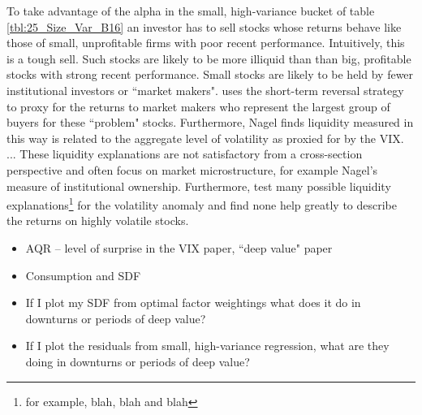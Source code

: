 To take advantage of the alpha in the small, high-variance bucket of table
\ref{tbl:25_Size_Var_B16} an investor has to sell stocks whose returns behave
like those of small, unprofitable firms with poor recent performance.
Intuitively, this is a tough sell.
Such stocks are likely to be more illiquid than than big, profitable stocks
with strong recent performance.
Small stocks are likely to be held by fewer institutional investors or
``market makers".
\textcite{nagel2012evaporating} uses the short-term reversal strategy to proxy
for the returns to market makers who represent the largest group of buyers for
these ``problem" stocks.
Furthermore, Nagel finds liquidity measured in this way is related to the
aggregate level of volatility as proxied for by the VIX.
\textcite{nagel2005short} ...
These liquidity explanations are not satisfactory from a cross-section
perspective and often focus on market microstructure, for example Nagel's
measure of institutional ownership.
Furthermore, \textcite{ang2006cross} test many possible liquidity
explanations\footnote{for example, blah, blah and blah}
for the volatility anomaly and find none help greatly to describe the returns
on highly volatile stocks.

\begin{itemize}
  \item AQR -- level of surprise in the VIX paper, ``deep value" paper
  \item Consumption and SDF
  \item If I plot my SDF from optimal factor weightings what does it do in
  downturns or periods of deep value?
  \item If I plot the residuals from small, high-variance regression, what are
  they doing in downturns or periods of deep value?
\end{itemize}
